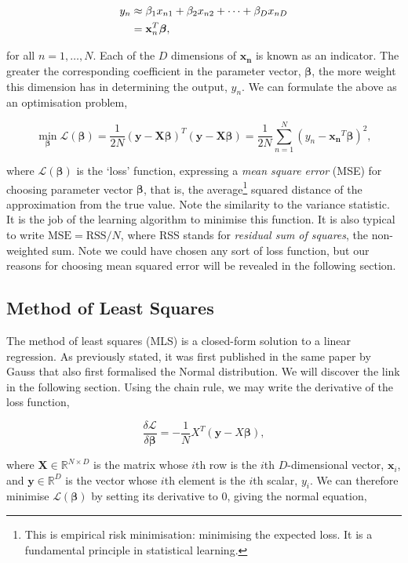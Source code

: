 \documentclass[11pt]{amsart}
\begin{document}
\begin{align}
y_n &\approx \beta_1x_{n1} + \beta_2x_{n2} + \cdots + \beta_Dx_{nD} \notag \\
&= \mathbf{x}_n^T\boldsymbol\beta, \notag
\end{align}

for all $n = 1, \dots, N$. Each of the $D$ dimensions of $\mathbf{x_n}$ is known as an indicator. The greater the corresponding coefficient in the parameter vector, $\boldsymbol\beta$, the more weight this dimension has in determining the output, $y_n$. We can formulate the above as an optimisation problem,

$$\min_{\boldsymbol\beta}\mathcal{L}(\boldsymbol\beta) = \frac{1}{2N}(\mathbf{y} - \mathbf{X}\boldsymbol\beta)^T(\mathbf{y} - \mathbf{X}\boldsymbol\beta) = \frac{1}{2N}\sum_{n=1}^{N}(y_n - \mathbf{x_n}^T\boldsymbol\beta)^2,$$

where $\mathcal{L}(\boldsymbol\beta)$ is the `loss' function, expressing a \emph{mean square error} (MSE) for choosing parameter vector $\boldsymbol\beta$, that is, the average\footnote{This is empirical risk minimisation: minimising the expected loss. It is a fundamental principle in statistical learning.} squared distance of the approximation from the true value. Note the similarity to the variance statistic. It is the job of the learning algorithm to minimise this function. It is also typical to write $\text{MSE} = \text{RSS}/N$, where RSS stands for \emph{residual sum of squares}, the non-weighted sum. Note we could have chosen any sort of loss function, but our reasons for choosing mean squared error will be revealed in the following section.

\subsection{Method of Least Squares}

The method of least squares (MLS) is a closed-form solution to a linear regression. As previously stated, it was first published in the same paper by Gauss that also first formalised the Normal distribution. We will discover the link in the following section. Using the chain rule, we may write the derivative of the loss function,

$$\frac{\delta\mathcal{L}}{\delta\boldsymbol\beta} = -\frac{1}{N}X^T(\mathbf{y} - X\boldsymbol\beta),$$

where $\mathbf{X} \in \mathbb{R}^{N\times D}$ is the matrix whose $i$th row is the $i$th $D$-dimensional vector, $\mathbf{x}_i$, and $\mathbf{y} \in \mathbb{R}^D$ is the vector whose $i$th element is the $i$th scalar, $y_i$. We can therefore minimise $\mathcal{L}(\boldsymbol\beta)$ by setting its derivative to 0, giving the normal equation,
\end{document}
